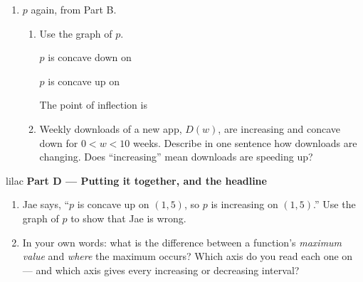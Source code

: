 \documentclass[10pt]{article}
\newcommand{\pcurve}{(-3,-3) .. controls (-2.6,0) and (-1.9,4) .. (-1,4)
  .. controls (1,4) and (1,-2) .. (3,-2) .. controls (3.8,-2) and (4.4,0) .. (5,3)}
\newcommand{\paxes}{%
  \draw[linegray, very thin, step=1] (-4,-4) grid (6,5);
  \draw[->, thick] (-4,0) -- (6.5,0) node[right] {\small $x$};
  \draw[->, thick] (0,-4) -- (0,5.5) node[above] {\small $p(x)$};
  \foreach \x in {-3,-2,-1,1,2,3,4,5} \node[below, font=\scriptsize] at (\x,0) {\x};
  \foreach \y in {-3,-2,-1,1,2,3,4} \node[left, font=\scriptsize] at (0,\y) {\y};}
\begin{document}
\begin{enumerate}[leftmargin=1.9em, itemsep=9pt, start=5]
\item[] \noindent\begin{minipage}[t]{0.34\linewidth}
      \vspace{0pt}
      \centering

      {\footnotesize $p$ again, from Part B.}
      \end{minipage}\hfill
      \begin{minipage}[t]{0.62\linewidth}
      \vspace{0pt}
      \begin{enumerate}[label=\arabic*., leftmargin=1.9em, itemsep=8pt, start=6]
      \item Use the graph of $p$.

            $p$ is concave down on \hfill \blank{2.2cm}

            $p$ is concave up on \hfill \blank{2.2cm}

            The point of inflection is \hfill \blank{2.2cm}

      \item Weekly downloads of a new app, $D(w)$, are increasing and concave down for
            $0 < w < 10$ weeks. Describe in one sentence how downloads are changing. Does
            ``increasing'' mean downloads are speeding up?
            \writespace{1.7cm}{}
      \end{enumerate}
      \end{minipage}

\end{enumerate}

\vspace{0.06in}

\begin{headlinebox}{lilac}
\textbf{\color{plum}Part D --- Putting it together, and the headline}
\end{headlinebox}

\begin{enumerate}[leftmargin=1.9em, itemsep=9pt, start=8]

\item Jae says, ``$p$ is concave up on $(1, 5)$, so $p$ is increasing on $(1, 5)$.'' Use the
      graph of $p$ to show that Jae is wrong.
      \writespace{1.6cm}{}

\item In your own words: what is the difference between a function's \emph{maximum value} and
      \emph{where} the maximum occurs? Which axis do you read each one on --- and which axis
      gives every increasing or decreasing interval?
      \writespace{2.0cm}{}

\end{enumerate}
\end{document}
